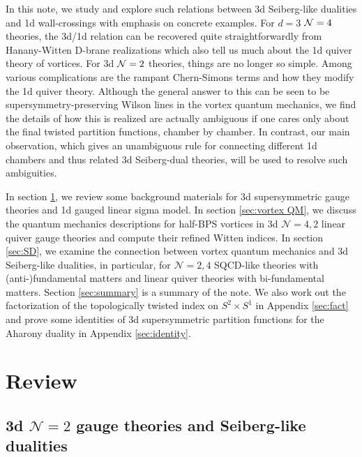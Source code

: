 \documentclass[a4paper,11pt]{article}
\begin{document}
In this note, we study and explore such relations between
3d Seiberg-like dualities and 1d wall-crossings with
emphasis on concrete examples.
For $d=3$ ${\cal N}=4$ theories, the 3d/1d relation can be
recovered quite straightforwardly from Hanany-Witten D-brane
realizations which also tell us much about the 1d quiver
theory of vortices.  For 3d ${\cal N}=2$
theories, things are no longer so simple. Among various
complications are the rampant Chern-Simons terms and how they
modify the 1d quiver theory. Although the general answer
to this can be seen to be supersymmetry-preserving Wilson lines
in the vortex quantum mechanics, we find the details of how this
is realized are actually ambiguous if one cares only about
the final twisted partition functions, chamber by chamber.
In contrast, our main observation, which gives an unambiguous
rule for connecting different 1d chambers and thus related
3d Seiberg-dual theories, will be used to resolve such ambiguities.

In section \ref{sec:review}, we review some background materials for 3d supersymmetric gauge theories and 1d gauged linear sigma model.
In section \ref{sec:vortex QM}, we discuss the quantum mechanics descriptions for half-BPS vortices in 3d $\mathcal N = 4, 2$ linear quiver gauge theories and compute their refined Witten indices.
In section \ref{sec:SD}, we examine the connection between vortex quantum mechanics and 3d Seiberg-like dualities, in particular, for $\mathcal N = 2, 4$ SQCD-like theories with (anti-)fundamental matters and linear quiver theories with bi-fundamental matters.
Section \ref{sec:summary} is a summary of the note.
We also work out the factorization of the topologically twisted index on $S^2 \times S^1$ in Appendix \ref{sec:fact} and prove some identities of 3d supersymmetric partition functions for the Aharony duality in Appendix \ref{sec:identity}.
\\





\section{Review}
\label{sec:review}

\subsection{3d $\mathcal N = 2$ gauge theories and Seiberg-like dualities}
\label{sec:3d}
\end{document}

